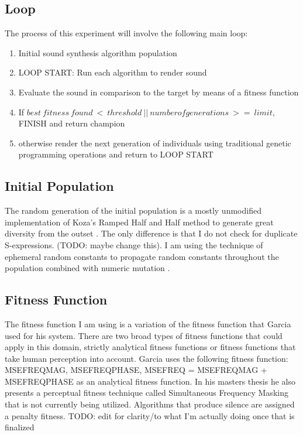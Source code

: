\documentclass[12pt]{article}
\begin{document}
\subsection{Loop}
The process of this experiment will involve the following main loop:
\begin{enumerate}
\item
Initial sound synthesis algorithm population
\item
LOOP START:
Run each algorithm to render sound
\item
Evaluate the sound in comparison to the target by means of a fitness function
\item
If $best\ fitness\ found\ <\ threshold\ ||\ number of generations\ >=\ limit$, FINISH and return champion
\item
otherwise render the next generation of individuals using traditional genetic programming operations and return to LOOP START
\end{enumerate}
\subsection{Initial Population}
The random generation of the initial population is a mostly unmodified implementation of Koza's Ramped Half and Half method to generate great diversity from the outset \citep{koza1992genetic}. The only difference is that I do not check for duplicate S-expressions. (TODO: maybe change this). I am using the technique of ephemeral random constants to propagate random constants throughout the population combined with numeric mutation \citep{evett1998numeric}.
\subsection{Fitness Function}
The fitness function I am using is a variation of the fitness function that Garcia used for his system. There are two broad types of fitness functions that could apply in this domain, strictly analytical fitness functions or fitness functions that take human perception into account. Garcia uses the following fitness function: MSEFREQMAG, MSEFREQPHASE, MSEFREQ = MSEFREQMAG + MSEFREQPHASE as an analytical fitness function. In his masters thesis he also presents a perceptual fitness technique called Simultaneous Frequency Masking that is not currently being utilized. Algorithms that produce silence are assigned a penalty fitness. TODO: edit for clarity/to what I'm actually doing once that is finalized
\end{document}

